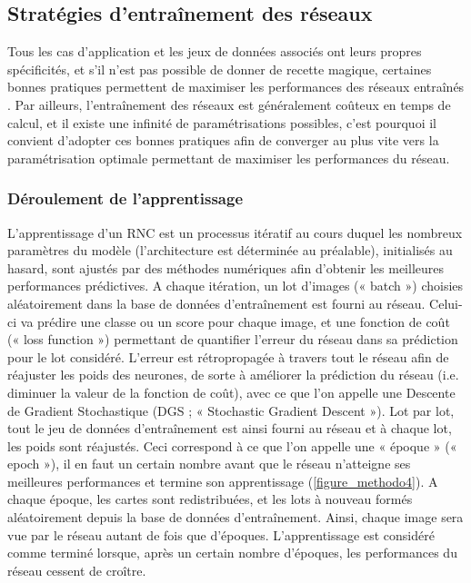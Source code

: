 \subsection{Stratégies d'entraînement des réseaux}

Tous les cas d’application et les jeux de données associés ont leurs propres spécificités, et s’il n’est pas possible de donner de recette magique, certaines bonnes pratiques permettent de maximiser les performances des réseaux entraînés \citep{he_bag_2019}. Par ailleurs, l’entraînement des réseaux est généralement coûteux en temps de calcul, et il existe une infinité de paramétrisations possibles, c’est pourquoi il convient d’adopter ces bonnes pratiques afin de converger au plus vite vers la paramétrisation optimale permettant de maximiser les performances du réseau.

\subsubsection{Déroulement de l'apprentissage}

L’apprentissage d’un RNC est un processus itératif au cours duquel les nombreux paramètres du modèle (l’architecture est déterminée au préalable), initialisés au hasard, sont ajustés par des méthodes numériques afin d’obtenir les meilleures performances prédictives. A chaque itération, un lot d’images (« batch ») choisies aléatoirement dans la base de données d’entraînement est fourni au réseau. Celui-ci va prédire une classe ou un score pour chaque image, et une fonction de coût (« loss function ») permettant de quantifier l’erreur du réseau dans sa prédiction pour le lot considéré. L’erreur est rétropropagée à travers tout le réseau afin de réajuster les poids des neurones, de sorte à améliorer la prédiction du réseau (i.e. diminuer la valeur de la fonction de coût), avec ce que l’on appelle une Descente de Gradient Stochastique (DGS ; « Stochastic Gradient Descent »). Lot par lot, tout le jeu de données d’entraînement est ainsi fourni au réseau et à chaque lot, les poids sont réajustés. Ceci correspond à ce que l’on appelle une « époque » (« epoch »), il en faut un certain nombre avant que le réseau n’atteigne ses meilleures performances et termine son apprentissage (\autoref{figure_methodo4}). A chaque époque, les cartes sont redistribuées, et les lots à nouveau formés aléatoirement depuis la base de données d’entraînement. Ainsi, chaque image sera vue par le réseau autant de fois que d’époques. L’apprentissage est considéré comme terminé lorsque, après un certain nombre d’époques, les performances du réseau cessent de croître.

